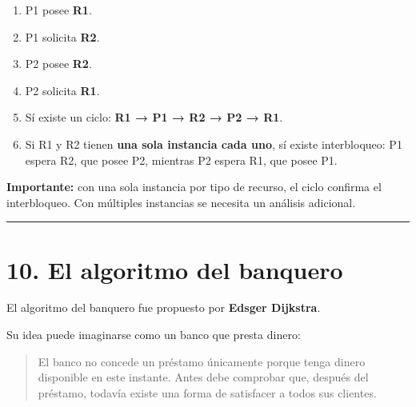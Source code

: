 \documentclass[
  spanish,
  letterpaper,
]{scrbook}
\providecommand{\tightlist}{%
  \setlength{\itemsep}{0pt}\setlength{\parskip}{0pt}}
\begin{document}
\begin{tcolorbox}[enhanced jigsaw, arc=.35mm, bottomrule=.15mm, bottomtitle=1mm, breakable, colback=white, colbacktitle=quarto-callout-tip-color!10!white, colframe=quarto-callout-tip-color-frame, coltitle=black, left=2mm, leftrule=.75mm, opacityback=0, opacitybacktitle=0.6, rightrule=.15mm, title=\textcolor{quarto-callout-tip-color}{\faLightbulb}\hspace{0.5em}{✅ Ver solución}, titlerule=0mm, toprule=.15mm, toptitle=1mm]

\begin{enumerate}
\def\labelenumi{\arabic{enumi}.}
\tightlist
\item
  P1 posee \textbf{R1}.
\item
  P1 solicita \textbf{R2}.
\item
  P2 posee \textbf{R2}.
\item
  P2 solicita \textbf{R1}.
\item
  Sí existe un ciclo: \textbf{R1 → P1 → R2 → P2 → R1}.
\item
  Si R1 y R2 tienen \textbf{una sola instancia cada uno}, sí existe
  interbloqueo: P1 espera R2, que posee P2, mientras P2 espera R1, que
  posee P1.
\end{enumerate}

\textbf{Importante:} con una sola instancia por tipo de recurso, el
ciclo confirma el interbloqueo. Con múltiples instancias se necesita un
análisis adicional.

\end{tcolorbox}

\begin{center}\rule{0.5\linewidth}{0.5pt}\end{center}


\chapter{10. El algoritmo del banquero}\label{el-algoritmo-del-banquero}

El algoritmo del banquero fue propuesto por \textbf{Edsger Dijkstra}.

Su idea puede imaginarse como un banco que presta dinero:

\begin{quote}
El banco no concede un préstamo únicamente porque tenga dinero
disponible en este instante. Antes debe comprobar que, después del
préstamo, todavía existe una forma de satisfacer a todos sus clientes.
\end{quote}
\end{document}
